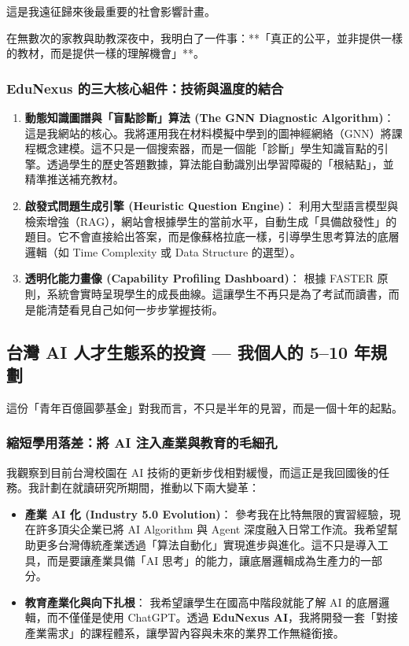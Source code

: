 \documentclass[12pt,a4paper]{article}
\begin{document}
這是我遠征歸來後最重要的社會影響計畫。

在無數次的家教與助教深夜中，我明白了一件事：**「真正的公平，並非提供一樣的教材，而是提供一樣的理解機會」**。

\subsubsection{EduNexus 的三大核心組件：技術與溫度的結合}
\begin{enumerate}
    \item \textbf{動態知識圖譜與「盲點診斷」算法 (The GNN Diagnostic Algorithm)}：
    這是我網站的核心。我將運用我在材料模擬中學到的圖神經網絡（GNN）將課程概念建模。這不只是一個搜索器，而是一個能「診斷」學生知識盲點的引擎。透過學生的歷史答題數據，算法能自動識別出學習障礙的「根結點」，並精準推送補充教材。
    
    \item \textbf{啟發式問題生成引擎 (Heuristic Question Engine)}：
    利用大型語言模型與檢索增強（RAG），網站會根據學生的當前水平，自動生成「具備啟發性」的題目。它不會直接給出答案，而是像蘇格拉底一樣，引導學生思考算法的底層邏輯（如 Time Complexity 或 Data Structure 的選型）。
    
    \item \textbf{透明化能力畫像 (Capability Profiling Dashboard)}：
    根據 FASTER 原則，系統會實時呈現學生的成長曲線。這讓學生不再只是為了考試而讀書，而是能清楚看見自己如何一步步掌握技術。
\end{enumerate}

\newpage

\subsection{台灣 AI 人才生態系的投資 --- 我個人的 5--10 年規劃}

這份「青年百億圓夢基金」對我而言，不只是半年的見習，而是一個十年的起點。

\subsubsection{縮短學用落差：將 AI 注入產業與教育的毛細孔}
我觀察到目前台灣校園在 AI 技術的更新步伐相對緩慢，而這正是我回國後的任務。我計劃在就讀研究所期間，推動以下兩大變革：

\begin{itemize}
    \item \textbf{產業 AI 化 (Industry 5.0 Evolution)}：
    參考我在比特無限的實習經驗，現在許多頂尖企業已將 AI Algorithm 與 Agent 深度融入日常工作流。我希望幫助更多台灣傳統產業透過「算法自動化」實現進步與進化。這不只是導入工具，而是要讓產業具備「AI 思考」的能力，讓底層邏輯成為生產力的一部分。
    
    \item \textbf{教育產業化與向下扎根}：
    我希望讓學生在國高中階段就能了解 AI 的底層邏輯，而不僅僅是使用 ChatGPT。透過 \textbf{EduNexus AI}，我將開發一套「對接產業需求」的課程體系，讓學習內容與未來的業界工作無縫銜接。
\end{itemize}
\end{document}
